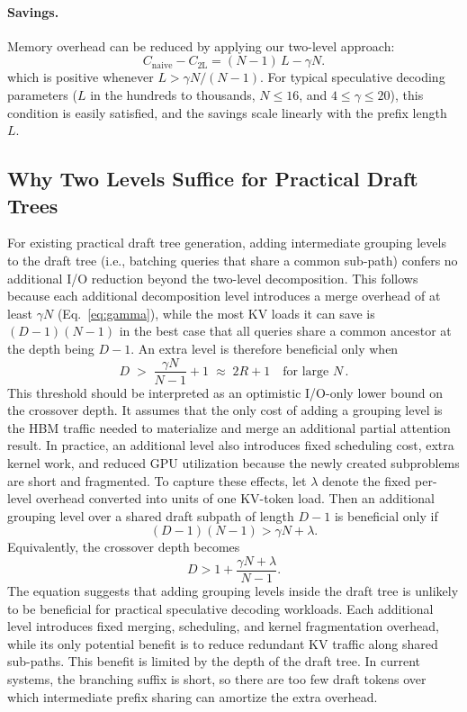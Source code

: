 \documentclass{article}
\begin{document}
\paragraph{Savings.} Memory overhead can be reduced by applying our two-level approach:
\begin{equation}
  C_{\mathrm{naive}} - C_{\mathrm{2L}}
  = (N{-}1)\,L - \gamma N .
  \label{eq:savings}
\end{equation}
which is positive whenever $L > \gamma N/(N{-}1)$.  For typical speculative
decoding parameters ($L$ in the hundreds to thousands, $N \leq 16$,
and $ 4 \leq \gamma \leq 20$), this condition is easily satisfied, and the savings
scale linearly with the prefix length~$L$.


\subsection{Why Two Levels Suffice for Practical Draft Trees}
\label{sec:optimal_grouping}
For existing practical draft tree generation, adding intermediate grouping levels to the draft tree (i.e., batching queries that share a common sub-path) confers no additional I/O reduction beyond the two-level decomposition. 
This follows because each additional decomposition level introduces a merge overhead of at least $\gamma N$ (Eq.~\ref{eq:gamma}), while the most KV loads it can save is $(D-1)(N-1)$ in the best case that all queries share
a common ancestor at the depth being $D-1$. 
An extra level is therefore beneficial only when
\[
  D \;>\; \frac{\gamma N}{N - 1} + 1
  \;\approx\; 2R + 1 \quad\text{for large } N\,.
\]
This threshold should be interpreted as an optimistic I/O-only lower bound on
the crossover depth. It assumes that the only cost of adding a grouping level is
the HBM traffic needed to materialize and merge an additional partial attention
result. In practice, an additional level also introduces fixed scheduling cost,
extra kernel work, and reduced GPU utilization because the newly created
subproblems are short and fragmented.
To capture these effects, let $\lambda$ denote the fixed per-level overhead
converted into units of one KV-token load. Then an additional grouping level over a shared draft
subpath of length $D-1$ is beneficial only if
\[
  (D-1)(N-1)
  >
  \gamma N + \lambda.
\]
Equivalently, the crossover depth becomes
\[
  D
  >
  1 +
  \frac{\gamma N + \lambda}{N-1}.
\]
The equation suggests that adding grouping levels inside the draft tree is unlikely to be beneficial for practical speculative decoding workloads. Each additional level introduces fixed merging, scheduling, and kernel fragmentation overhead, while its only potential benefit is to reduce redundant KV traffic along shared sub-paths. This benefit is limited by the depth of the draft tree. In current systems, the branching suffix is short, so there are too few draft tokens over which intermediate prefix sharing can amortize the extra overhead.
\end{document}

